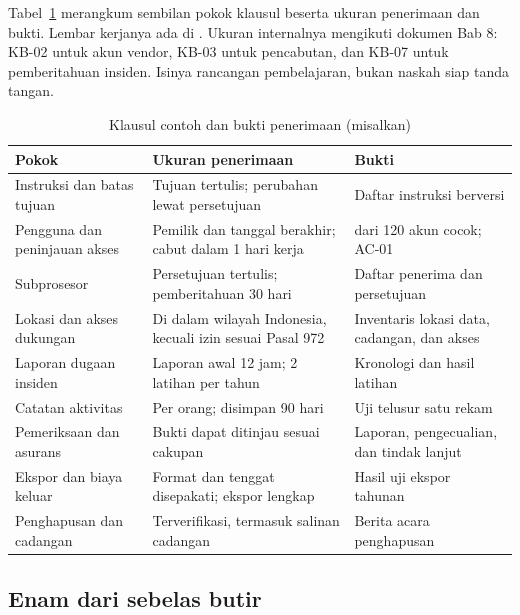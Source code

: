 Tabel~\ref{tab:ch09-kontrak} merangkum sembilan pokok klausul beserta ukuran penerimaan dan bukti.
Lembar kerjanya ada di . Ukuran internalnya mengikuti
dokumen Bab 8: KB-02 untuk akun vendor, KB-03 untuk pencabutan, dan KB-07 untuk pemberitahuan
insiden. Isinya rancangan pembelajaran, bukan naskah siap tanda tangan.

\begin{table}[!htb]
  \centering\small
  \caption{Klausul contoh dan bukti penerimaan (misalkan)}\label{tab:ch09-kontrak}
  \begin{tabularx}{\textwidth}{|>{\raggedright\arraybackslash}p{}|>{\raggedright\arraybackslash}X|>{\raggedright\arraybackslash}X|}
    \hline
    \textbf{Pokok} & \textbf{Ukuran penerimaan} & \textbf{Bukti} \\ \hline
    Instruksi dan batas tujuan & Tujuan tertulis; perubahan lewat persetujuan & Daftar instruksi
    berversi \\ \hline
    Pengguna dan peninjauan akses & Pemilik dan tanggal berakhir; cabut dalam 1 hari kerja & 120
    dari 120 akun cocok; AC-01 \\ \hline
    Subprosesor & Persetujuan tertulis; pemberitahuan 30 hari & Daftar penerima dan persetujuan \\
    \hline
    Lokasi dan akses dukungan & Di dalam wilayah Indonesia, kecuali izin sesuai Pasal 972 &
    Inventaris lokasi data, cadangan, dan akses \\ \hline
    Laporan dugaan insiden & Laporan awal 12 jam; 2 latihan per tahun & Kronologi dan hasil latihan
    \\ \hline
    Catatan aktivitas & Per orang; disimpan 90 hari & Uji telusur satu rekam \\ \hline
    Pemeriksaan dan asurans & Bukti dapat ditinjau sesuai cakupan & Laporan, pengecualian, dan
    tindak lanjut \\ \hline
    Ekspor dan biaya keluar & Format dan tenggat disepakati; ekspor lengkap & Hasil uji ekspor
    tahunan \\ \hline
    Penghapusan dan cadangan & Terverifikasi, termasuk salinan cadangan & Berita acara penghapusan
    \\ \hline
  \end{tabularx}
\end{table}

\subsection*{Enam dari sebelas butir}

